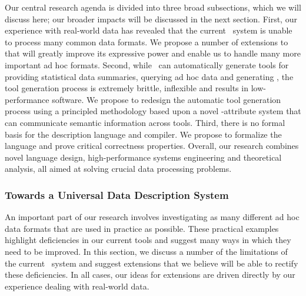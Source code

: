\documentclass[11pt]{article}
\begin{document}
Our central research agenda is divided into three broad subsections,
which we will discuss here; our broader impacts will be discussed in the next 
section.  First, our experience with real-world data has revealed that
the current \pads{}\ system is unable to process many common
data formats.  We propose a number of extensions to \pads{} 
that will greatly improve its expressive power and enable
us to handle many more important ad hoc formats.  Second,
while \pads{}\ can automatically generate tools for providing
statistical data summaries, querying ad hoc data and generating
\xml, the tool generation process is extremely brittle, inflexible
and results in low-performance software.  We propose to redesign
the automatic tool generation process using a principled methodology
based upon a novel \pads{}-attribute system that can communicate
semantic information across tools.  Third, there is no formal
basis for the \pads{} description language and compiler.  We propose to
formalize the language and prove critical \pads{} correctness
properties.  Overall, our research combines novel language
design, high-performance systems engineering and theoretical analysis,
all aimed at solving crucial data processing problems.

\subsubsection{Towards a Universal Data Description System}

An important part of our research involves investigating as many
different ad hoc data formats that are used in practice as possible.
These practical examples highlight deficiencies in our current tools
and suggest many ways in which they need to be improved.  In this
section, we discuss a number of the limitations of the current \pads{}\ 
system and suggest extensions that we believe will be able to rectify
these deficiencies.  In all cases, our ideas for extensions
are driven directly by our experience dealing with real-world data.
\end{document}
